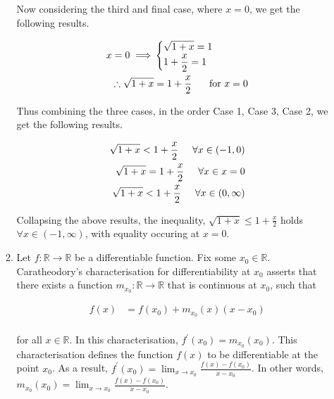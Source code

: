 \documentclass[a4paper]{article}
\begin{document}
\begin{enumerate}[label=\textbf{\arabic*.}]
\begin{enumerate}
		Now considering the third and final case, where $x=0$, we get the following results.

		\begin{align*}
		x = 0 \implies & 
		\begin{cases}
		\displaystyle{\sqrt{1+x} = 1}\\
		\displaystyle{1 + \frac{x}{2} = 1}\\
		\end{cases}\\
		\therefore \sqrt{1+x} & = 1 + \frac{x}{2} \hspace{5mm} \text{ for } x = 0\\
		\end{align*}

		Thus combining the three cases, in the order Case 1, Case 3, Case 2, we get the following results.

		\begin{align*}
		\sqrt{1+x} < 1 + \frac{x}{2} \hspace{5mm} \forall x \in (-1,0)\\
		\sqrt{1+x} = 1 + \frac{x}{2} \hspace{5mm} \forall x \in x=0\\
		\sqrt{1+x} < 1 + \frac{x}{2} \hspace{5mm} \forall x \in (0,\infty)\\
		\end{align*}

		Collapsing the above results, the inequality, $\displaystyle{\sqrt{1+x} \leq 1 + \frac{x}{2}}$ holds $\forall x \in (-1,\infty)$, with equality occuring at $x=0$.

		\bigbreak

		\item Let $f:\mathbb{R} \rightarrow \mathbb{R}$ be a differentiable function. Fix some $x_0 \in \mathbb{R}$. Caratheodory's characterisation for differentiability at $x_0$ asserts that there exists a function $m_{x_0}:\mathbb{R} \rightarrow \mathbb{R}$ that is continuous at $x_0$, such that 

		\begin{align*}
		f(x) & = f(x_0) + m_{x_0}(x)(x-x_0)\\
		\end{align*}

		for all $x \in \mathbb{R}$. In this characterisation, $f^\prime (x_0) = m_{x_0}(x_0)$. This characterisation defines the function $f(x)$ to be differentiable at the point $x_0$. As a result, $\displaystyle{f^\prime(x_0) = \lim_{x \to x_0}\frac{f(x)-f(x_0)}{x-x_0}}$. In other words, $\displaystyle{m_{x_0}(x_0) = \lim_{x \to x_0}\frac{f(x)-f(x_0)}{x-x_0}}$.


\end{enumerate}
\end{enumerate}
\end{document}
